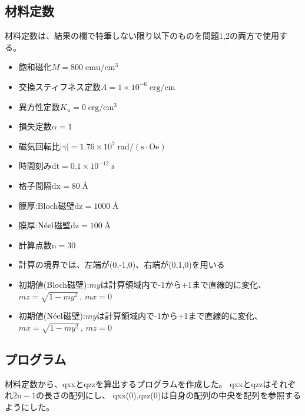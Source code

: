 \documentclass{jsarticle}
\begin{document}
\subsection{材料定数}
材料定数は、結果の欄で特筆しない限り以下のものを問題1,2の両方で使用する。
\begin{itemize}
	\item 飽和磁化$M = 800\;\mathrm{emu/cm^3}$
	\item 交換スティフネス定数$A = 1\times 10^{-6}\;\mathrm{erg/cm}$
	\item 異方性定数$K_u = 0\;\mathrm{erg/cm^3}$
	\item 損失定数$\alpha = 1$
	\item 磁気回転比$\lvert\gamma\rvert = 1.76\times 10^7\;\mathrm{rad/(s\cdot Oe)}$
	\item 時間刻み$\mathrm{dt} = 0.1\times 10^{-12}\;\mathrm{s}$
	\item 格子間隔$\mathrm{dx} = 80\;$\AA
	\item 膜厚:Bloch磁壁$\mathrm{dz} = 1000\;$\AA
	\item 膜厚:$\mathrm{N\Acute{e}el}$磁壁$\mathrm{dz} = 100\;$\AA
	\item 計算点数$\mathrm{n} = 30$
	\item 計算の境界では、左端が(0,-1,0)、右端が(0,1,0)を用いる
	\item 初期値(Bloch磁壁):$my$は計算領域内で-1から+1まで直線的に変化、$mz=\sqrt{1-my^2}\,,\,mx=0$
	\item 初期値($\mathrm{N\Acute{e}el}$磁壁):$my$は計算領域内で-1から+1まで直線的に変化、$mx=\sqrt{1-my^2}\,,\,mz=0$
\end{itemize}

\subsection{プログラム}
材料定数から、qxxとqzzを算出するプログラムを作成した。
qxxとqzzはそれぞれ$2\mathrm{n}-1$の長さの配列にし、
qxx(0),qzz(0)は自身の配列の中央を配列を参照するようにした。
\end{document}
